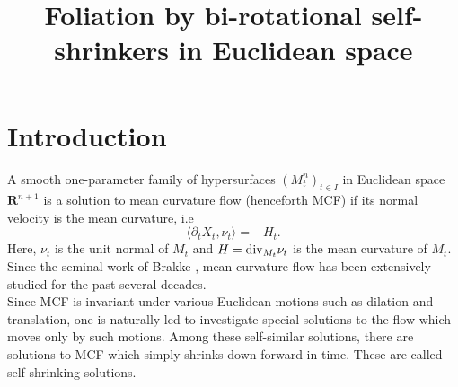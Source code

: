 \documentclass[pdflatex,sn-mathphys-num]{sn-jnl}
\begin{document}
\title[Foliation by bi-rotational self-shrinkers in Euclidean space]{Foliation by bi-rotational self-shrinkers in Euclidean space}

\author*[1]{ }



\maketitle
\tableofcontents
\section{Introduction}
A smooth one-parameter family of hypersurfaces $(M_t^n)_{t  \in I}$ in Euclidean space $\mathbf{R}^{n+1}$ is a solution to mean curvature flow (henceforth MCF) if its normal velocity is the mean curvature, i.e
\begin{equation}
    \langle \partial_tX_t, \nu_t \rangle  = -H_t.
\end{equation}
Here, $\nu_t$ is the unit normal of $M_t$ and $H = \textit{{\normalfont div}}_{M_t}\nu_t$ is the mean curvature of $M_t$. Since the seminal work of Brakke \cite{Br}, mean curvature flow has been extensively studied for the past several decades. \\

Since MCF is invariant under various Euclidean motions such as dilation and translation, one is naturally led to investigate special solutions to the flow which moves only by such motions. Among these self-similar solutions, there are solutions to MCF which simply shrinks down forward in time. These are called self-shrinking solutions. \\
\end{document}
